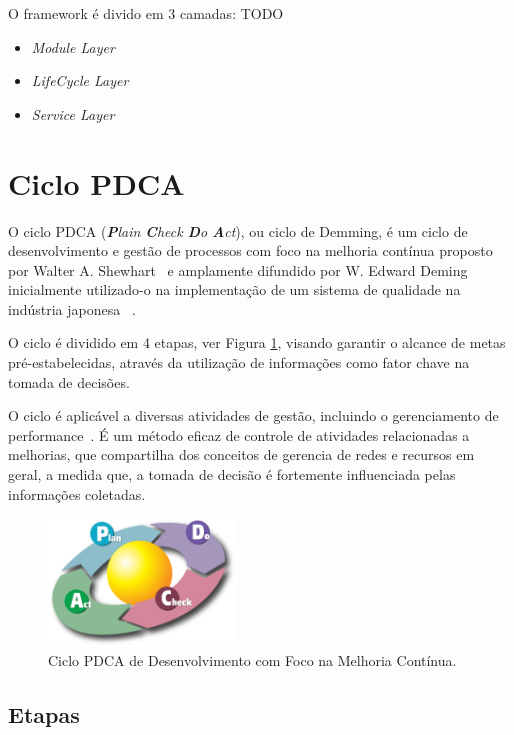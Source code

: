 O framework é divido em 3 camadas:
TODO
\begin{itemize}
	\item \textit{Module Layer}

	\item \textit{LifeCycle Layer}

	\item \textit{Service Layer}
\end{itemize}


\section{Ciclo PDCA}
\label{sec:pdca}
O ciclo PDCA (\textit{\textbf{P}lain \textbf{C}heck \textbf{D}o \textbf{A}ct}), ou ciclo de  Demming, é um ciclo de desenvolvimento e gestão de processos com foco na melhoria contínua proposto por Walter A. Shewhart~\cite{shewhart} e amplamente difundido por W. Edward Deming~\cite{deming} inicialmente utilizado-o na implementação de um sistema de qualidade na indústria japonesa ~\cite{fabio2003}.

O ciclo é dividido em 4 etapas, ver Figura \ref{fig:pdca}, visando garantir o alcance de metas pré-estabelecidas, através da utilização de informações como fator chave na tomada de decisões.

O ciclo é aplicável a diversas atividades de gestão, incluindo o gerenciamento de performance~\cite{pdcapm}. É um método eficaz de controle de atividades relacionadas a melhorias, que compartilha dos conceitos de gerencia de redes e recursos em geral, a medida que, a tomada de decisão é fortemente influenciada pelas informações coletadas.


\begin{figure}[htp]
\centering
\includegraphics[width=5cm]{chapters/chapter2/pdca_cycle.png}
\caption[Ciclo PDCA]{Ciclo PDCA de Desenvolvimento com Foco na Melhoria Contínua.}
\label{fig:pdca}
\end{figure}


\subsection{Etapas}
\label{pdca:phases}
